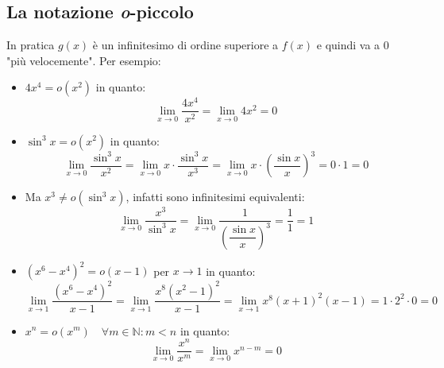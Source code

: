 \subsection{La notazione \textit{o}-piccolo}
In pratica $g(x)$ è un infinitesimo di ordine superiore a $f(x)$ e quindi va a 
0 "più velocemente". Per esempio:
\begin{itemize}
	\item $4x^4 = o(x^2)$ in quanto:
		\begin{equation*}
			\lim_{x \to 0} \dfrac{4x^4}{x^2} = \lim_{x \to 0} 4x^2 = 0
		\end{equation*}
	\item $\sin^3{x} = o(x^2)$ in quanto:
		\begin{equation*}
			\lim_{x \to 0} \dfrac{\sin^3{x}}{x^2} = \lim_{x \to 0} x \cdot 
            \dfrac{\sin^3{x}}{x^3} = \lim_{x \to 0} x \cdot \left(\dfrac{
                \sin{x}}{x} \right)^3 = 0 \cdot 1 = 0
		\end{equation*}
	
	\item Ma $x^3 \neq o(\sin^3{x})$, infatti sono infinitesimi equivalenti:
		\begin{equation*}
			\lim_{x \to 0} \dfrac{x^3}{\sin^3{x}} = \lim_{x \to 0} \dfrac{1}
            {\left(\dfrac{\sin{x}}{x} \right)^3} = \dfrac{1}{1} = 1
		\end{equation*}

	\item $(x^6 - x^4)^2 = o(x-1)$ per $x \to 1$ in quanto:
		\begin{equation*}
			\lim_{x \to 1} \dfrac{(x^6 - x^4)^2}{x-1} = \lim_{x \to 1} 
            \dfrac{x^8 (x^2 -1)^2}{x-1} = \lim_{x \to 1} x^8 (x+1)^2 (x-1) = 1 
            \cdot 2^2 \cdot 0 = 0
		\end{equation*}

	\item $x^n = o(x^m) \quad \forall m \in \mathbb{N}: m < n$ in quanto:
		\begin{equation*}
			\lim_{x \to 0} \dfrac{x^n}{x^m} = \lim_{x \to 0} x^{n-m} = 0
		\end{equation*}
\end{itemize}
